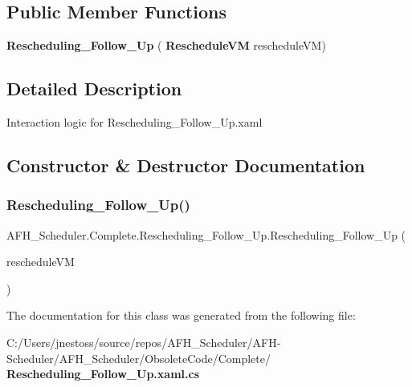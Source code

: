 \subsection*{Public Member Functions}
\begin{DoxyCompactItemize}
\item 
\textbf{ Rescheduling\+\_\+\+Follow\+\_\+\+Up} (\textbf{ Reschedule\+VM} reschedule\+VM)
\end{DoxyCompactItemize}


\subsection{Detailed Description}
Interaction logic for Rescheduling\+\_\+\+Follow\+\_\+\+Up.\+xaml 



\subsection{Constructor \& Destructor Documentation}
\mbox{\label{class_a_f_h___scheduler_1_1_complete_1_1_rescheduling___follow___up_a11c8a5f1511808230f631d8f727bfb50}} 
\subsubsection{Rescheduling\_Follow\_Up()}
{\footnotesize\ttfamily A\+F\+H\+\_\+\+Scheduler.\+Complete.\+Rescheduling\+\_\+\+Follow\+\_\+\+Up.\+Rescheduling\+\_\+\+Follow\+\_\+\+Up (\begin{DoxyParamCaption}\item[{\textbf{ Reschedule\+VM}}]{reschedule\+VM }\end{DoxyParamCaption})}



The documentation for this class was generated from the following file\+:\begin{DoxyCompactItemize}
\item 
C\+:/\+Users/jnestoss/source/repos/\+A\+F\+H\+\_\+\+Scheduler/\+A\+F\+H-\/\+Scheduler/\+A\+F\+H\+\_\+\+Scheduler/\+Obsolete\+Code/\+Complete/\textbf{ Rescheduling\+\_\+\+Follow\+\_\+\+Up.\+xaml.\+cs}\end{DoxyCompactItemize}
